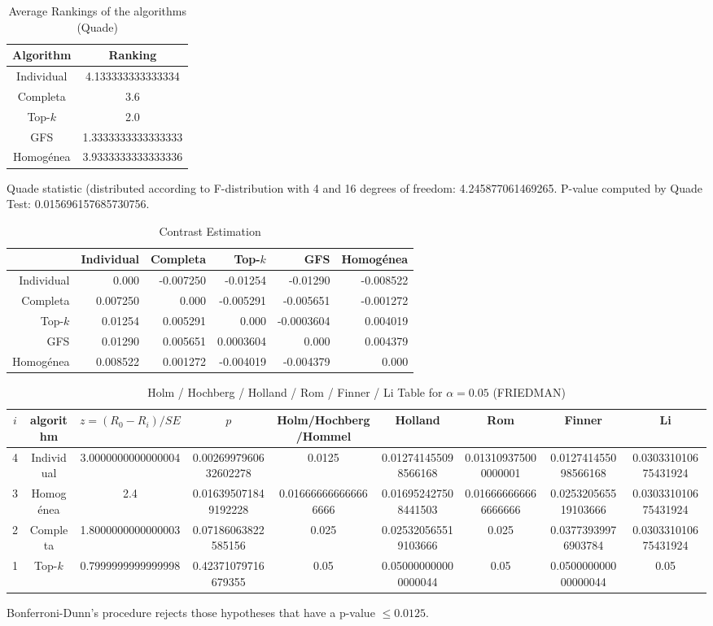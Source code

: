 \documentclass[a4paper,10pt]{article}
\begin{document}
\begin{landscape}
\newpage

\begin{table}[!htp]
\centering
\caption{Average Rankings of the algorithms (Quade)
}\begin{tabular}{c|c}
Algorithm&Ranking\\
\hline
Individual&4.133333333333334\\
Completa&3.6\\
Top-$k$&2.0\\
GFS&1.3333333333333333\\
Homogénea&3.9333333333333336\\
\end{tabular}
\end{table}
Quade statistic (distributed according to F-distribution with 4 and 16 degrees of freedom: 4.245877061469265. 
P-value computed by Quade Test: 0.015696157685730756.\newline


\newpage

\begin{table}[!htp]
\centering\tiny
\caption{Contrast Estimation}
\begin{tabular}{
|r|r|r|r|r|r|}
\hline
 &Individual&Completa&Top-$k$&GFS&Homogénea\\
\hline
Individual&0.000&-0.007250&-0.01254&-0.01290&-0.008522\\
\hline
Completa&0.007250&0.000&-0.005291&-0.005651&-0.001272\\
\hline
Top-$k$&0.01254&0.005291&0.000&-0.0003604&0.004019\\
\hline
GFS&0.01290&0.005651&0.0003604&0.000&0.004379\\
\hline
Homogénea&0.008522&0.001272&-0.004019&-0.004379&0.000\\
\hline

\end{tabular}
\end{table}

\newpage

\begin{table}[!htp]
\centering\scriptsize
\caption{Holm / Hochberg / Holland / Rom / Finner / Li Table for $\alpha=0.05$ (FRIEDMAN)}
\begin{tabular}{ccccccccc}
$i$&algorithm&$z=(R_0 - R_i)/SE$&$p$&Holm/Hochberg/Hommel&Holland&Rom&Finner&Li\\
\hline
4&Individual&3.0000000000000004&0.0026997960632602278&0.0125&0.012741455098566168&0.013109375000000001&0.012741455098566168&0.030331010675431924\\
3&Homogénea&2.4&0.016395071849192228&0.016666666666666666&0.016952427508441503&0.016666666666666666&0.025320565519103666&0.030331010675431924\\
2&Completa&1.8000000000000003&0.07186063822585156&0.025&0.025320565519103666&0.025&0.03773939976903784&0.030331010675431924\\
1&Top-$k$&0.7999999999999998&0.42371079716679355&0.05&0.050000000000000044&0.05&0.050000000000000044&0.05\\
\hline
\end{tabular}
\end{table}
Bonferroni-Dunn's procedure rejects those hypotheses that have a p-value $\le0.0125$.



\end{landscape}
\end{document}
